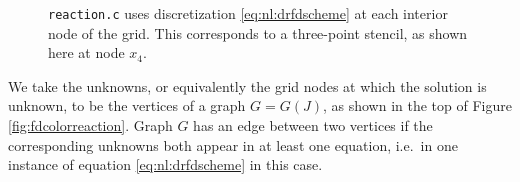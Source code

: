 \begin{figure}
\caption{\texttt{reaction.c} uses discretization \eqref{eq:nl:drfdscheme} at each interior node of the grid.  This corresponds to a three-point stencil, as shown here at node $x_4$.}
\label{fig:stencilreaction}
\end{figure}

We take the unknowns, or equivalently the grid nodes at which the solution is unknown, to be the vertices of a graph $G=G(J)$, as shown in the top of Figure \ref{fig:fdcolorreaction}.  Graph $G$ has an edge between two vertices if the corresponding unknowns both appear in at least one equation, i.e.~in one instance of equation \eqref{eq:nl:drfdscheme} in this case.

